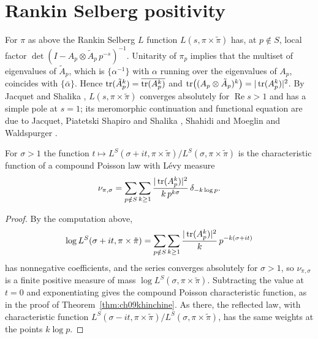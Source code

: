 \section{Rankin Selberg positivity}

For $\pi$ as above the Rankin Selberg $L$ function $L(s,\pi\times\tilde\pi)$ has, at $p\notin S$, local factor $\det(I - A_p\otimes \tilde A_p\, p^{-s})^{-1}$. Unitarity of $\pi_p$ implies that the multiset of eigenvalues of $\tilde A_p$, which is $\{\alpha^{-1}\}$ with $\alpha$ running over the eigenvalues of $A_p$, coincides with $\{\bar\alpha\}$. Hence $\operatorname{tr}(\tilde A_p^k) = \overline{\operatorname{tr}(A_p^k)}$ and $\operatorname{tr}\bigl((A_p\otimes\tilde A_p)^k\bigr) = |\operatorname{tr}(A_p^k)|^2$. By Jacquet and Shalika \cite{jacquetshalika1981}, $L(s,\pi\times\tilde\pi)$ converges absolutely for $\operatorname{Re} s>1$ and has a simple pole at $s=1$; its meromorphic continuation and functional equation are due to Jacquet, Piatetski Shapiro and Shalika \cite{jpss1983}, Shahidi \cite{shahidi1981} and Moeglin and Waldspurger \cite{moeglinwaldspurger1989}.

\begin{theorem}\label{thm:ch09rs}
For $\sigma>1$ the function $t\mapsto L^S(\sigma+it,\pi\times\tilde\pi)/L^S(\sigma,\pi\times\tilde\pi)$ is the characteristic function of a compound Poisson law with L\'evy measure
\[
\nu_{\pi,\sigma} = \sum_{p\notin S}\sum_{k\ge1} \frac{|\operatorname{tr}(A_p^k)|^2}{k\,p^{k\sigma}}\,\delta_{-k\log p}.
\]
\end{theorem}

\begin{proof}
By the computation above,
\[
\log L^S(\sigma+it,\pi\times\tilde\pi) = \sum_{p\notin S}\sum_{k\ge 1} \frac{|\operatorname{tr}(A_p^k)|^2}{k}\, p^{-k(\sigma+it)}
\]
has nonnegative coefficients, and the series converges absolutely for $\sigma>1$, so $\nu_{\pi,\sigma}$ is a finite positive measure of mass $\log L^S(\sigma,\pi\times\tilde\pi)$. Subtracting the value at $t=0$ and exponentiating gives the compound Poisson characteristic function, as in the proof of Theorem~\ref{thm:ch09khinchine}. As there, the reflected law, with characteristic function $L^S(\sigma-it,\pi\times\tilde\pi)/L^S(\sigma,\pi\times\tilde\pi)$, has the same weights at the points $k\log p$.
\end{proof}

